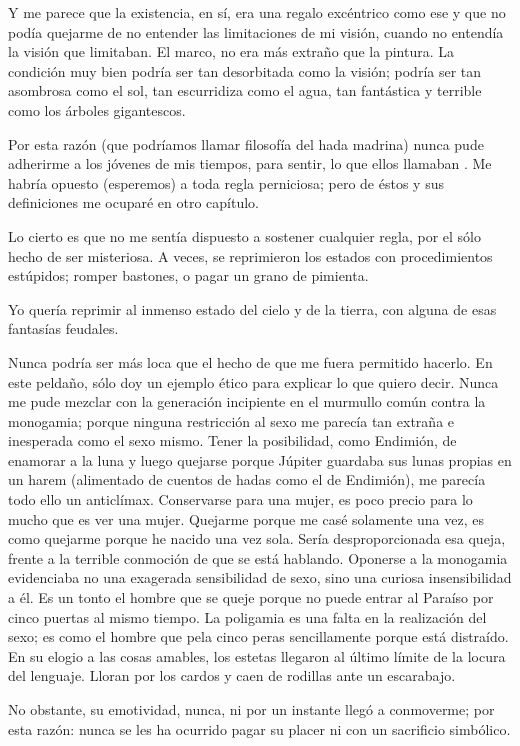 Y me parece que la existencia, en sí, era una regalo excéntrico como ese y que no podía quejarme
de no entender las limitaciones de mi visión, cuando no entendía la visión que limitaban. El marco, no era
más extraño que la pintura. La condición muy bien podría ser tan desorbitada como la visión; podría ser
tan asombrosa como el sol, tan escurridiza como el agua, tan fantástica y terrible como los árboles
gigantescos.

Por esta razón (que podríamos llamar filosofía del hada madrina) nunca pude adherirme a los
jóvenes de mis tiempos, para sentir, lo que ellos llamaban . Me habría
opuesto (esperemos) a toda regla perniciosa; pero de éstos y sus definiciones me ocuparé en otro capítulo.

Lo cierto es que no me sentía dispuesto a sostener cualquier regla, por el sólo hecho de ser misteriosa. A
veces, se reprimieron los estados con procedimientos estúpidos; romper bastones, o pagar un grano de
pimienta.

Yo quería reprimir al inmenso estado del cielo y de la tierra, con alguna de esas fantasías feudales.

Nunca podría ser más loca que el hecho de que me fuera permitido hacerlo. En este peldaño, sólo
doy un ejemplo ético para explicar lo que quiero decir. Nunca me pude mezclar con la generación
incipiente en el murmullo común contra la monogamia; porque ninguna restricción al sexo me parecía tan
extraña e inesperada como el sexo mismo. Tener la posibilidad, como Endimión, de enamorar a la luna y
luego quejarse porque Júpiter guardaba sus lunas propias en un harem (alimentado de cuentos de hadas
como el de Endimión), me parecía todo ello un anticlímax. Conservarse para una mujer, es poco precio
para lo mucho que es ver una mujer. Quejarme porque me casé solamente una vez, es como quejarme
porque he nacido una vez sola. Sería desproporcionada esa queja, frente a la terrible conmoción de que se
está hablando. Oponerse a la monogamia evidenciaba no una exagerada sensibilidad de sexo, sino una
curiosa insensibilidad a él. Es un tonto el hombre que se queje porque no puede entrar al Paraíso por
cinco puertas al mismo tiempo. La poligamia es una falta en la realización del sexo; es como el hombre
que pela cinco peras sencillamente porque está distraído. En su elogio a las cosas amables, los estetas
llegaron al último límite de la locura del lenguaje. Lloran por los cardos y caen de rodillas ante un
escarabajo.

No obstante, su emotividad, nunca, ni por un instante llegó a conmoverme; por esta razón: nunca se
les ha ocurrido pagar su placer ni con un sacrificio simbólico.

